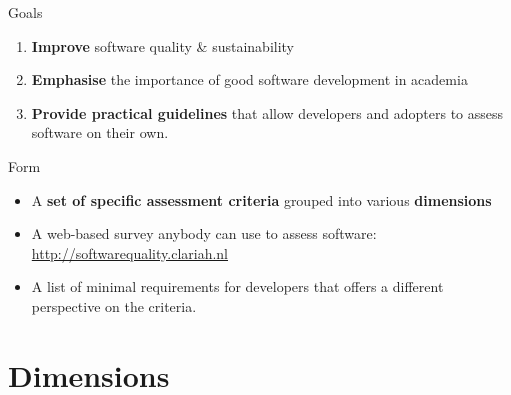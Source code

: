 \documentclass[compress]{beamer}
\begin{document}
\begin{frame}
    \begin{block}{Goals}
        \begin{enumerate}
            \item \textbf{Improve} software quality \& sustainability
            \item \textbf{Emphasise} the importance of good software development in academia
            \item \textbf{Provide practical guidelines} that allow developers and adopters to assess software on their own.
        \end{enumerate}
    \end{block}
    \begin{block}{Form}
        \begin{itemize}
            \item A \textbf{set of specific assessment criteria} grouped into various \textbf{dimensions}
            \item A web-based survey anybody can use to assess software: \url{http://softwarequality.clariah.nl}
            \item A list of minimal requirements for developers that offers a different perspective on the criteria.
        \end{itemize}
    \end{block}
\end{frame}

\section{Dimensions}
\end{document}
